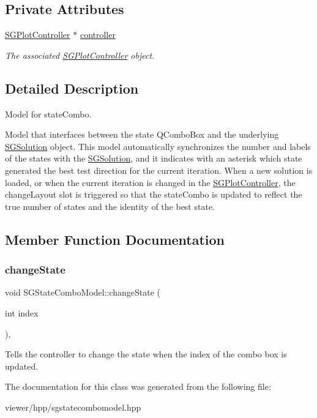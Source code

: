\subsection*{Private Attributes}
\begin{DoxyCompactItemize}
\item 
\mbox{\label{classSGStateComboModel_ada13b186d9f5870b772685cdadde7339}} 
\hyperlink{classSGPlotController}{S\+G\+Plot\+Controller} $\ast$ \hyperlink{classSGStateComboModel_ada13b186d9f5870b772685cdadde7339}{controller}
\begin{DoxyCompactList}\small\item\em The associated \hyperlink{classSGPlotController}{S\+G\+Plot\+Controller} object. \end{DoxyCompactList}\end{DoxyCompactItemize}


\subsection{Detailed Description}
Model for state\+Combo. 

Model that interfaces between the state Q\+Combo\+Box and the underlying \hyperlink{classSGSolution}{S\+G\+Solution} object. This model automatically synchronizes the number and labels of the states with the \hyperlink{classSGSolution}{S\+G\+Solution}, and it indicates with an asterisk which state generated the best test direction for the current iteration. When a new solution is loaded, or when the current iteration is changed in the \hyperlink{classSGPlotController}{S\+G\+Plot\+Controller}, the change\+Layout slot is triggered so that the state\+Combo is updated to reflect the true number of states and the identity of the best state. 

\subsection{Member Function Documentation}
\mbox{\label{classSGStateComboModel_a8e6030912a1495371e598466d9ac18a1}} 
\subsubsection{\texorpdfstring{change\+State}{changeState}}
{\footnotesize\ttfamily void S\+G\+State\+Combo\+Model\+::change\+State (\begin{DoxyParamCaption}\item[{int}]{index }\end{DoxyParamCaption})\hspace{0.3cm}{\ttfamily [inline]}, {\ttfamily [slot]}}

Tells the controller to change the state when the index of the combo box is updated. 

The documentation for this class was generated from the following file\+:\begin{DoxyCompactItemize}
\item 
viewer/hpp/sgstatecombomodel.\+hpp\end{DoxyCompactItemize}
